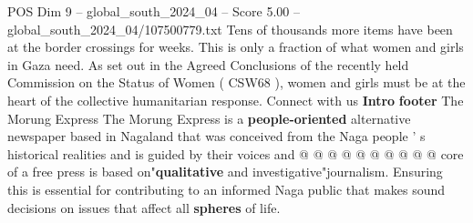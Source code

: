 \begin{textsample}{POS Dim 9 – global\_south\_2024\_04 – Score 5.00 – global\_south\_2024\_04/107500779.txt}
Tens of thousands more items have been at the border crossings for weeks.
This is only a fraction of what women and girls in Gaza need.
As set out in the Agreed Conclusions of the recently held Commission on the Status of Women ( CSW68 ), women and girls must be at the heart of the collective humanitarian response.
Connect with us \textbf{Intro} \textbf{footer} The Morung Express The Morung Express is a \textbf{people-oriented} alternative newspaper based in Nagaland that was conceived from the Naga people ' s historical realities and is guided by their voices and @ @ @ @ @ @ @ @ @ @ core of a free press is based on"\textbf{qualitative} and investigative"journalism.
Ensuring this is essential for contributing to an informed Naga public that makes sound decisions on issues that affect all \textbf{spheres} of life.

\end{textsample}
